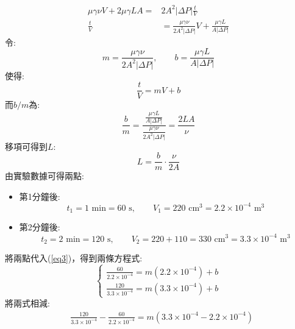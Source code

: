 \documentclass[12pt,a4paper]{article}
\begin{document}
\begin{problems}
\begin{enumerate}
\begin{align}
      \mu\gamma\nu V + 2\mu\gamma LA =& 2A^2\left|\Delta P\right|\frac{t}{V} \nonumber\\
      \frac{t}{V} &= \boxed{\frac{\mu\gamma\nu}{2A^2\left|\Delta P\right|}}V + \boxed{\frac{\mu\gamma L}{A\left|\Delta P\right|}} \label{eq2}
    \end{align}
    令:
    \begin{equation}
        m=\frac{\mu\gamma\nu}{2A^2\left|\Delta P\right|},\qquad b=\frac{\mu\gamma L}{A\left|\Delta P\right|} \label{eq6}
    \end{equation}
    使得:
    \begin{equation}
        \frac{t}{V} = mV + b \label{eq3}
    \end{equation}
    而$b/m$為:
    \begin{equation}
      \frac{b}{m} = \frac{\frac{\mu\gamma L}{A\left|\Delta P\right|}}{\frac{\mu\gamma\nu}{2A^2\left|\Delta P\right|}} = \frac{2LA}{\nu}
    \end{equation}
    移項可得到$L$:
    \begin{equation}
      L = \frac{b}{m}\cdot \frac{\nu}{2A} \label{eq5}
    \end{equation}
    由實驗數據可得兩點:
    \begin{itemize}
      \item 第1分鐘後:
      \begin{equation}
        t_1 = 1 \text{ min}  = 60 \text{ s},\qquad V_1 = 220 \text{ cm}^3 = 2.2\times10^{-4} \text{ m}^3
      \end{equation}
      \item 第2分鐘後:
      \begin{equation}
        t_2 = 2 \text{ min}  = 120 \text{ s},\qquad V_2 = 220 + 110 = 330 \text{ cm}^3 = 3.3\times10^{-4} \text{ m}^3
      \end{equation}
    \end{itemize}
    將兩點代入(\ref{eq3})，得到兩條方程式:
    \begin{equation}
      \begin{cases}
        \frac{60}{2.2\times10^{-4}} = m(2.2\times10^{-4}) + b \\
        \frac{120}{3.3\times10^{-4}} = m(3.3\times10^{-4}) + b
      \end{cases}\label{eq4}
    \end{equation}
    將兩式相減:
    \begin{align}
      &\frac{120}{3.3\times10^{-4}} - \frac{60}{2.2\times10^{-4}} = m\left(3.3\times10^{-4} - 2.2\times10^{-4}\right) \\

\end{align}
\end{enumerate}
\end{problems}
\end{document}
